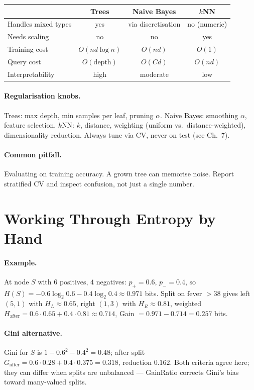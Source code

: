 \begin{center}\small
\begin{tabular}{lccc}
\toprule
 & Trees & Naive Bayes & $k$NN \\
\midrule
Handles mixed types & yes & via discretisation & no (numeric) \\
Needs scaling & no & no & yes \\
Training cost & $O(nd\log n)$ & $O(nd)$ & $O(1)$ \\
Query cost & $O(\text{depth})$ & $O(Cd)$ & $O(nd)$ \\
Interpretability & high & moderate & low \\
\bottomrule
\end{tabular}
\end{center}

\paragraph{Regularisation knobs.} Trees: max depth, min samples per leaf, pruning $\alpha$. Naive Bayes: smoothing $\alpha$, feature selection. $k$NN: $k$, distance, weighting (uniform vs.\ distance-weighted), dimensionality reduction. Always tune via CV, never on test (see Ch.~7).

\paragraph{Common pitfall.} Evaluating on training accuracy. A grown tree can memorise noise. Report stratified CV and inspect confusion, not just a single number.

\section{Working Through Entropy by Hand}
\label{sec:entropy-hand}
\paragraph{Example.} At node $S$ with $6$ positives, $4$ negatives: $p_+=0.6$, $p_-=0.4$, so $H(S)=-0.6\log_2 0.6 -0.4\log_2 0.4\approx0.971$ bits. Split on fever $>38$ gives left $(5,1)$ with $H_L\approx0.65$, right $(1,3)$ with $H_R\approx0.81$, weighted $H_{\text{after}}=0.6\cdot0.65+0.4\cdot0.81\approx0.714$, Gain $=0.971-0.714=0.257$ bits.

\paragraph{Gini alternative.} Gini for $S$ is $1-0.6^2-0.4^2=0.48$; after split $G_{\text{after}}=0.6\cdot0.28+0.4\cdot0.375=0.318$, reduction $0.162$. Both criteria agree here; they can differ when splits are unbalanced --- GainRatio corrects Gini's bias toward many-valued splits.

